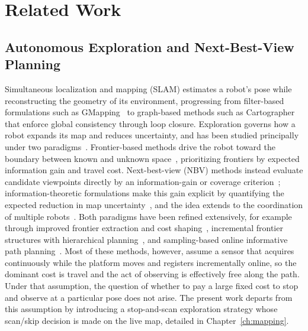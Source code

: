 \chapter{Related Work}
\label{ch:related}

\section{Autonomous Exploration and Next-Best-View Planning}
\label{sec:rw-exploration}

Simultaneous localization and mapping (SLAM) estimates a robot's pose while
reconstructing the geometry of its environment, progressing from filter-based
formulations such as GMapping~\cite{grisetti2007} to graph-based methods such as
Cartographer~\cite{hess2016} that enforce global consistency through loop
closure. Exploration governs how a robot expands its map and reduces
uncertainty, and has been studied principally under two
paradigms~\cite{placed2023,lluvia2021}. Frontier-based methods drive the robot
toward the boundary between known and unknown
space~\cite{yamauchi1997,umari2017}, prioritizing frontiers by expected
information gain and travel cost. Next-best-view (NBV) methods instead evaluate
candidate viewpoints directly by an information-gain or coverage
criterion~\cite{connolly1985,bircher2016}; information-theoretic formulations
make this gain explicit by quantifying the expected reduction in map
uncertainty~\cite{stachniss2005}, and the idea extends to the coordination of
multiple robots~\cite{burgard2005}. Both paradigms have been refined
extensively, for example through improved frontier extraction and cost
shaping~\cite{he2025,quin2021}, incremental frontier structures with
hierarchical planning~\cite{zhou2021}, and sampling-based online informative
path planning~\cite{schmid2020}. Most of these methods, however, assume a
sensor that acquires continuously while the platform moves and registers
incrementally online, so the dominant cost is travel and the act of observing
is effectively free along the path. Under that assumption, the question of
whether to pay a large fixed cost to stop and observe at a particular pose does
not arise. The present work departs from this assumption by introducing a
stop-and-scan exploration strategy whose scan/skip decision is made on the live
map, detailed in Chapter~\ref{ch:mapping}.

